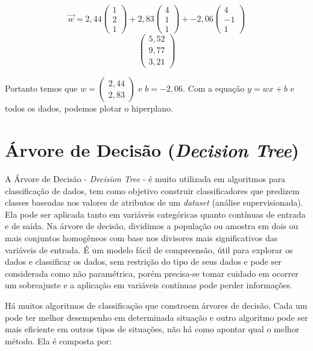 \documentclass[
]{book}
\begin{document}
\[\vec{w}=2,44\begin{pmatrix} 1\\2\\1\end{pmatrix}+
2,83\begin{pmatrix} 4\\1\\1\end{pmatrix}+
-2,06\begin{pmatrix} 4\\-1\\1\end{pmatrix}\]
\[\begin{pmatrix}5,52\\9,77\\3,21\end{pmatrix}\]

Portanto temos que \(w=\begin{pmatrix} 2,44\\2,83\end{pmatrix}\) e \(b=-2,06\). Com a equação \(y=wx+b\) e todos os dados, podemos plotar o hiperplano.

\hypertarget{decisiontree}{%
\section{\texorpdfstring{Árvore de Decisão (\emph{Decision Tree})}{Árvore de Decisão (Decision Tree)}}\label{decisiontree}}

A Árvore de Decisão - \emph{Decision Tree} - é muito utilizada em algoritmos para classificação de dados, tem como objetivo construir classificadores que predizem classes baseadas nos valores de atributos de um \emph{dataset} (análise supervisionada). Ela pode ser aplicada tanto em variáveis categóricas quanto contínuas de entrada e de saída. Na árvore de decisão, dividimos a população ou amostra em dois ou mais conjuntos homogêneos com base nos divisores mais significativos das variáveis de entrada. É um modelo fácil de compreensão, útil para explorar os dados e classificar os dados, sem restrição do tipo de seus dados e pode ser considerada como não paramétrica, porém precisa-se tomar cuidado em ocorrer um sobreajuste e a aplicação em variáveis contínuas pode perder informações.

Há muitos algoritmos de classificação que constroem árvores de decisão. Cada um pode ter melhor desempenho em determinada situação e outro algoritmo pode ser mais eficiente em outros tipos de situações, não há como apontar qual o melhor método. Ela é composta por:
\end{document}
